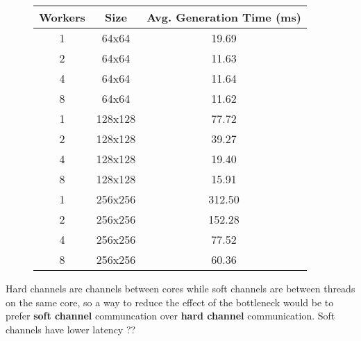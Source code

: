 \documentclass{article}
\begin{document}
    \begin{figure}[h]
        \begin{center}
            \begin{tabular}{|c|c|c|}
                \hline Workers & Size & Avg. Generation Time (ms) \\
                \hline 1 & 64x64 & 19.69 \\
                2 & 64x64 & 11.63 \\
                4 & 64x64 & 11.64 \\
                8 & 64x64 & 11.62 \\
                1 & 128x128	& 77.72 \\
                2 & 128x128	& 39.27 \\
                4 & 128x128 & 19.40 \\
                8 & 128x128 & 15.91 \\
                1 & 256x256	& 312.50 \\
                2 & 256x256	& 152.28 \\
                4 & 256x256	& 77.52 \\
                8 & 256x256	& 60.36 \\
                \hline
            \end{tabular}
        \end{center}
    \end{figure}

    Hard channels are channels between cores while soft channels are between threads on the same core, so a way to reduce the effect of the bottleneck would be to prefer \textbf{soft channel} communcation over \textbf{hard channel} communication. Soft channels have lower latency ??
\end{document}
